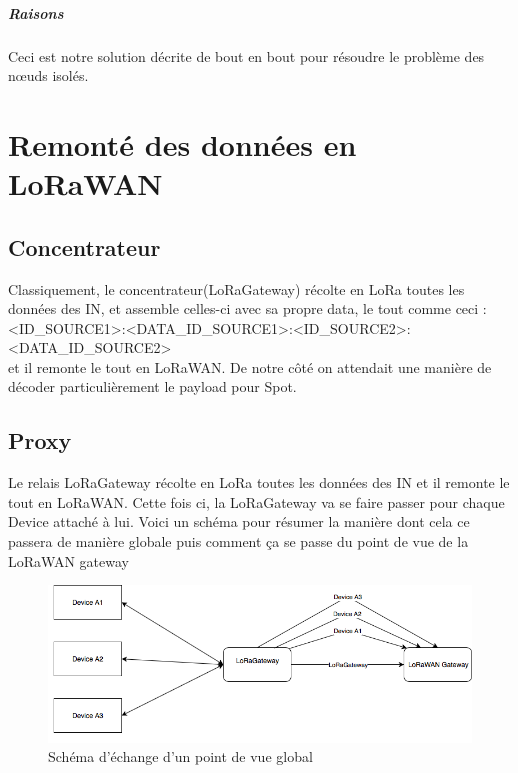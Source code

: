 \documentclass[a4paper, 11pt]{article}
\begin{document}
\subparagraph{Raisons}
Ceci est notre solution décrite de bout en bout pour résoudre le problème des n\oe{}uds isolés.
\newpage
\section*{Remonté des données en LoRaWAN}

\subsection*{Concentrateur}
Classiquement, le concentrateur(LoRaGateway) récolte en LoRa toutes les données des IN, et assemble celles-ci avec sa propre data, le tout comme ceci :\\ <ID\_SOURCE1>:<DATA\_ID\_SOURCE1>:<ID\_SOURCE2>:<DATA\_ID\_SOURCE2>\\ et il remonte le tout en LoRaWAN. De notre côté on attendait une manière de décoder particulièrement le payload pour Spot.
\subsection*{Proxy}
Le relais LoRaGateway récolte en LoRa toutes les données des IN et il remonte le tout en LoRaWAN. Cette fois ci, la LoRaGateway va se faire passer pour chaque Device attaché à lui. Voici un schéma pour résumer la manière dont cela ce passera de manière globale puis comment ça se passe du point de vue de la LoRaWAN gateway 

\begin{figure}[!ht]    \centering
   \includegraphics[scale=0.65]{diag.png} 
   \caption{Schéma d'échange d'un point de vue global}
   \label{Schéma d'échange d'un point de vue global}
\end{figure}
\end{document}
